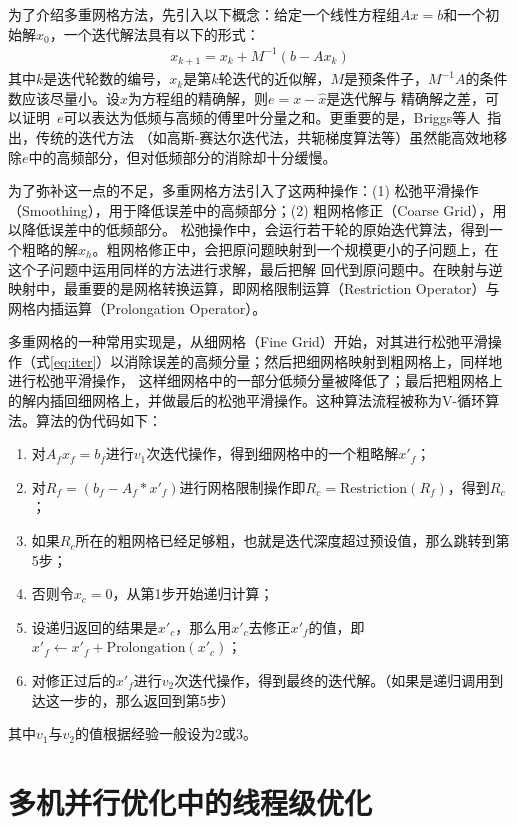 为了介绍多重网格方法，先引入以下概念：给定一个线性方程组$Ax=b$和一个初始解$x_0$，一个迭代解法具有以下的形式：
\begin{align}
    x_{k+1} = x_k + M^{-1} (b-Ax_k)
    \label{eq:iter}
\end{align}
其中$k$是迭代轮数的编号，$x_k$是第$k$轮迭代的近似解，$M$是预条件子，$M^{-1}A$的条件数应该尽量小。设$\hat{x}$为方程组的精确解，则$e=x-\hat{x}$是迭代解与
精确解之差，可以证明~\cite{briggs2000multigrid}$e$可以表达为低频与高频的傅里叶分量之和。更重要的是，Briggs等人~\cite{briggs2000multigrid}指出，传统的迭代方法
（如高斯-赛达尔迭代法，共轭梯度算法等）虽然能高效地移除$e$中的高频部分，但对低频部分的消除却十分缓慢。

为了弥补这一点的不足，多重网格方法引入了这两种操作：(1) 松弛平滑操作（Smoothing），用于降低误差中的高频部分；(2) 粗网格修正（Coarse Grid），用以降低误差中的低频部分。
松弛操作中，会运行若干轮的原始迭代算法，得到一个粗略的解$x_h$。粗网格修正中，会把原问题映射到一个规模更小的子问题上，在这个子问题中运用同样的方法进行求解，最后把解
回代到原问题中。在映射与逆映射中，最重要的是网格转换运算，即网格限制运算（Restriction Operator）与网格内插运算（Prolongation Operator）。

多重网格的一种常用实现是，从细网格（Fine Grid）开始，对其进行松弛平滑操作（式\ref{eq:iter}）以消除误差的高频分量；然后把细网格映射到粗网格上，同样地进行松弛平滑操作，
这样细网格中的一部分低频分量被降低了；最后把粗网格上的解内插回细网格上，并做最后的松弛平滑操作。这种算法流程被称为V-循环算法。算法的伪代码如下：

\begin{enumerate}
\item 对$A_f x_f = b_f$进行$v_1$次迭代操作，得到细网格中的一个粗略解$x'_{f}$；
\item 对$R_f=(b_f - A_f * x'_{f})$进行网格限制操作即$R_c=\text{Restriction}(R_f)$，得到$R_c$；
\item 如果$R_c$所在的粗网格已经足够粗，也就是迭代深度超过预设值，那么跳转到第5步；
\item 否则令$x_c=0$，从第1步开始递归计算；
\item 设递归返回的结果是$x'_c$，那么用$x'_c$去修正$x'_f$的值，即$x'_f \leftarrow x'_f + \text{Prolongation}(x'_c)$；
\item 对修正过后的$x'_f$进行$v_2$次迭代操作，得到最终的迭代解。（如果是递归调用到达这一步的，那么返回到第5步）
\end{enumerate}
其中$v_1$与$v_2$的值根据经验一般设为2或3。

\section{多机并行优化中的线程级优化}

